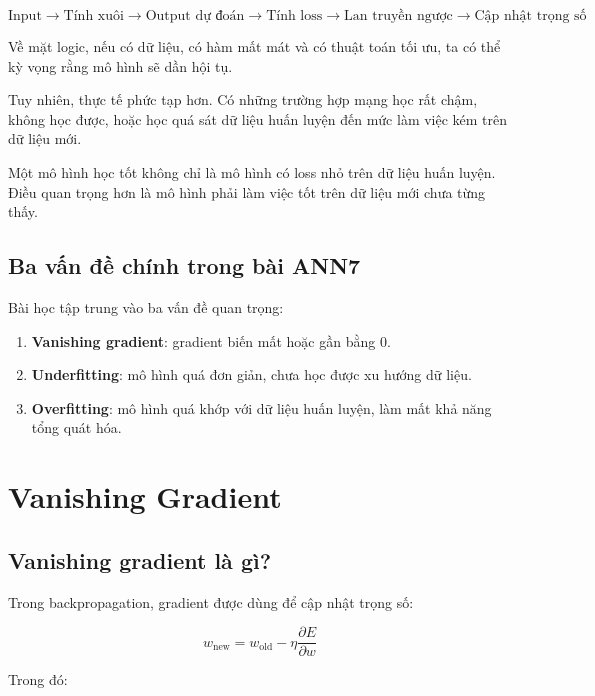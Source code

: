\documentclass[12pt,a4paper]{report}
\begin{document}
\[
    \text{Input}
    \rightarrow
    \text{Tính xuôi}
    \rightarrow
    \text{Output dự đoán}
    \rightarrow
    \text{Tính loss}
    \rightarrow
    \text{Lan truyền ngược}
    \rightarrow
    \text{Cập nhật trọng số}
\]

Về mặt logic, nếu có dữ liệu, có hàm mất mát và có thuật toán tối ưu, ta có thể kỳ vọng rằng mô hình sẽ dần hội tụ.

Tuy nhiên, thực tế phức tạp hơn. Có những trường hợp mạng học rất chậm, không học được, hoặc học quá sát dữ liệu huấn luyện đến mức làm việc kém trên dữ liệu mới.

\begin{ghinho}
Một mô hình học tốt không chỉ là mô hình có loss nhỏ trên dữ liệu huấn luyện. Điều quan trọng hơn là mô hình phải làm việc tốt trên dữ liệu mới chưa từng thấy.
\end{ghinho}

\section{Ba vấn đề chính trong bài ANN7}

Bài học tập trung vào ba vấn đề quan trọng:

\begin{enumerate}
    \item \textbf{Vanishing gradient}: gradient biến mất hoặc gần bằng 0.
    \item \textbf{Underfitting}: mô hình quá đơn giản, chưa học được xu hướng dữ liệu.
    \item \textbf{Overfitting}: mô hình quá khớp với dữ liệu huấn luyện, làm mất khả năng tổng quát hóa.
\end{enumerate}

\chapter{Vanishing Gradient}

\section{Vanishing gradient là gì?}

Trong backpropagation, gradient được dùng để cập nhật trọng số:

\[
    w_{\text{new}}
    =
    w_{\text{old}}
    -
    \eta
    \frac{\partial E}{\partial w}
\]

Trong đó:
\end{document}
